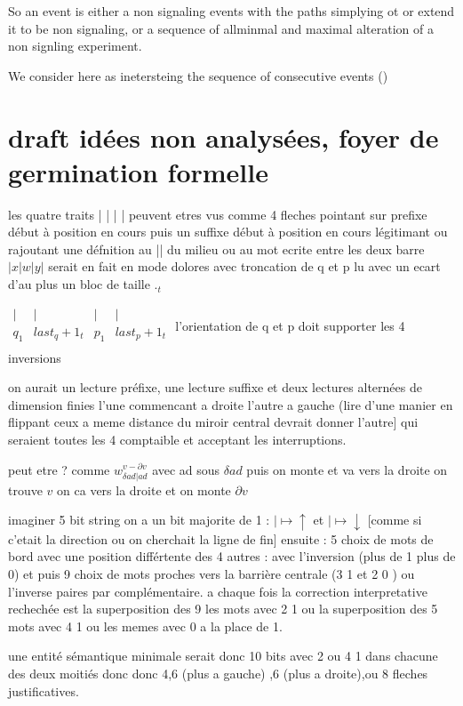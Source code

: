 \documentclass{article}
\begin{document}
 So an event is either a non signaling events with the paths simplying ot or extend it to be non signaling, or a sequence of allminmal and maximal alteration of a non signling experiment.
 
 We consider here as inetersteing the sequence of consecutive events ()
 
   
\section{draft idées non analysées, foyer de germination formelle}
les quatre traits  | | | | peuvent etres vus comme 4 fleches pointant sur prefixe début à position en cours puis un suffixe début à position en cours légitimant ou rajoutant une défnition au || du milieu ou au mot ecrite entre les deux barre $|x|w|y|$  serait en fait en mode dolores avec troncation de q et p lu avec un ecart d'au plus un bloc de taille $._t$
 
 $\begin {matrix} 
  |&|&|&|\\
q_1& last_q+1_t& p_1 & last_p+1_t\\
\end{matrix}$
l'orientation de q et p doit supporter les 4 inversions

on aurait un lecture préfixe, une lecture suffixe et deux lectures alternées de dimension finies  l'une commencant a droite l'autre a gauche (lire d'une manier en flippant ceux a meme distance du miroir central devrait donner l'autre]   qui seraient toutes les 4 comptaible et acceptant les interruptions.


 peut etre ? comme $w_{\delta ad |ad}^{v-\partial v}$  avec ad sous $\delta ad$  puis on monte et va vers la droite on trouve $v$ on ca vers la droite et on monte $\partial v$


imaginer 5 bit string on a un bit majorite de 1 :  $| \mapsto  \uparrow$  et  $| \mapsto  \downarrow$  [comme si c'etait la direction ou on cherchait la ligne de fin] ensuite  : 5 choix de mots de bord avec une position différtente des 4 autres : avec l'inversion (plus de 1 plus de 0)  et puis  9 choix de mots proches vers la barrière centrale (3 1 et 2 0 ) ou l'inverse paires par complémentaire.
a chaque fois la correction interpretative rechechée est la superposition des 9 les mots avec 2 1  ou la superposition  des 5 mots avec 4 1
ou les memes avec 0 a la place de 1.

une entité sémantique minimale serait donc 10 bits avec 2 ou 4 1 dans chacune des deux moitiés donc donc 4,6 (plus a gauche) ,6 (plus a droite),ou 8 fleches justificatives.
\end{document}
